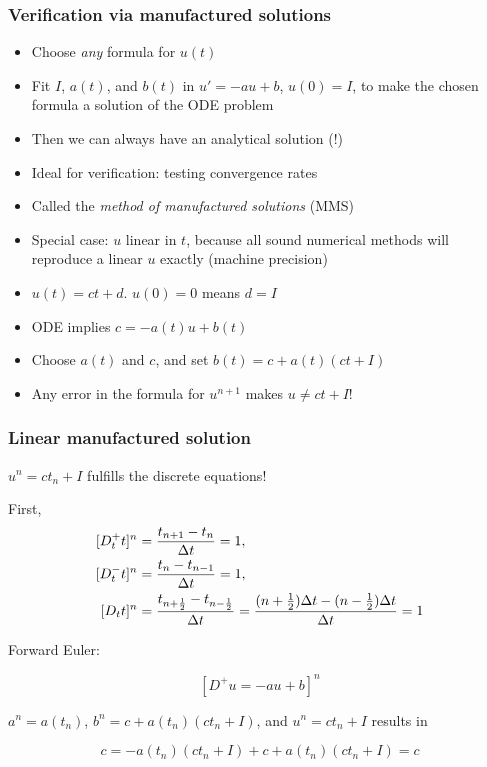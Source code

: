 \documentclass{beamer}
\begin{document}
\begin{frame}
\frametitle{Verification via manufactured solutions}

\label{decay:MMS}


\begin{itemize}
 \item Choose \emph{any} formula for $u(t)$

 \item Fit $I$, $a(t)$, and $b(t)$ in $u'=-au+b$, $u(0)=I$,
   to make the chosen formula a solution of the ODE problem

 \item Then we can always have an analytical solution (!)

 \item Ideal for verification: testing convergence rates

 \item Called the \emph{method of manufactured solutions} (MMS)

 \item Special case: $u$ linear in $t$, because all sound numerical
   methods will reproduce a linear $u$ exactly (machine precision)

 \item $u(t) = ct + d$. $u(0)=0$ means $d=I$

 \item ODE implies $c = -a(t)u + b(t)$

 \item Choose $a(t)$ and $c$, and set $b(t) = c + a(t)(ct + I)$

 \item Any error in the formula for $u^{n+1}$ makes $u\neq ct+I$!
\end{itemize}

\noindent
\end{frame}

\begin{frame}
\frametitle{Linear manufactured solution}

$u^n = ct_n+I$ fulfills the discrete
equations!

First,
\begin{align}
\lbrack D_t^+ t\rbrack^n &= \frac{t_{n+1}-t_n}{\Delta t}=1,
\label{decay:fd2:Dop:tn:fw}\\ 
\lbrack D_t^- t\rbrack^n &= \frac{t_{n}-t_{n-1}}{\Delta t}=1,
\label{decay:fd2:Dop:tn:bw}\\ 
\lbrack D_t t\rbrack^n &= \frac{t_{n+\half}-t_{n-\half}}{\Delta t}=\frac{(n+\half)\Delta t - (n-\half)\Delta t}{\Delta t}=1\label{decay:fd2:Dop:tn:cn}
\end{align}

Forward Euler:

\[ [D^+ u = -au + b]^n \]

$a^n=a(t_n)$, $b^n=c + a(t_n)(ct_n + I)$, and $u^n=ct_n + I$
results in

\[ c = -a(t_n)(ct_n+I) + c + a(t_n)(ct_n + I) = c \]
\end{frame}
\end{document}
